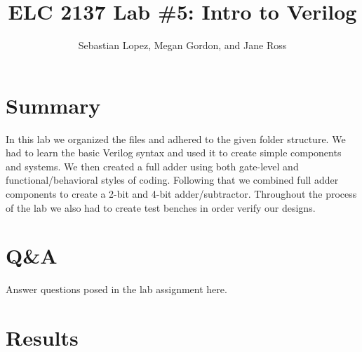 \documentclass[11pt]{article}
\begin{document}
\title{ELC 2137 Lab \#5: Intro to Verilog }
\author{Sebastian Lopez, Megan Gordon, and Jane Ross }

\maketitle


\section*{Summary}

In this lab we organized the files and adhered to the given folder structure. We had to learn the basic Verilog syntax and used it to create simple components and systems. We then created a full adder using both gate-level and functional/behavioral styles of coding. Following that we combined full adder components to create a 2-bit and 4-bit adder/subtractor. Throughout the process of the lab we also had to create test benches in order verify our designs.  

\section*{Q\&A}

Answer questions posed in the lab assignment here.

\section*{Results}
\end{document}
